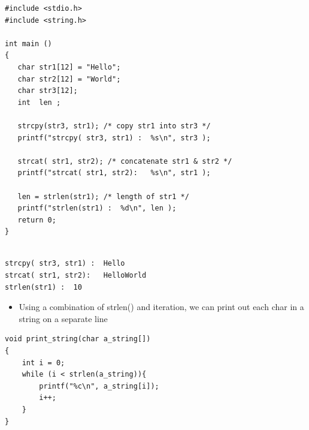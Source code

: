 \documentclass{beamer}
\begin{document}
\begin{frame}[fragile]
\begin{block}{}
\begin{lstlisting}
#include <stdio.h>
#include <string.h>

int main ()
{
   char str1[12] = "Hello";
   char str2[12] = "World";
   char str3[12];		
   int  len ;
 
   strcpy(str3, str1); /* copy str1 into str3 */
   printf("strcpy( str3, str1) :  %s\n", str3 );

   strcat( str1, str2); /* concatenate str1 & str2 */
   printf("strcat( str1, str2):   %s\n", str1 );
  
   len = strlen(str1); /* length of str1 */
   printf("strlen(str1) :  %d\n", len );
   return 0;
}

\end{lstlisting}
\end{block}

\begin{block}{}
\begin{lstlisting}

strcpy( str3, str1) :  Hello
strcat( str1, str2):   HelloWorld
strlen(str1) :  10

\end{lstlisting}
\end{block}
\end{frame}

\begin{frame}[fragile]
\begin{itemize}
\item Using a combination of strlen() and iteration, we can print out each char in a string on a separate line
\end{itemize}
\begin{block}{}
\begin{lstlisting}
void print_string(char a_string[])
{
    int i = 0;
    while (i < strlen(a_string)){
        printf("%c\n", a_string[i]);
        i++;
    }
}
\end{lstlisting}
\end{block}
\end{frame}
\end{document}
